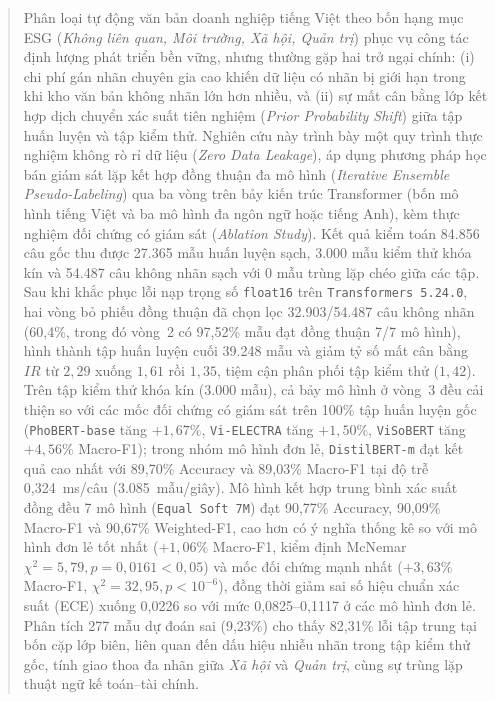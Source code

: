 \documentclass[journal,a4paper]{IEEEtran}
\newcommand{\code}[1]{\texttt{\small #1}}
\begin{document}
\begin{abstract}
Phân loại tự động văn bản doanh nghiệp tiếng Việt theo bốn hạng mục ESG (\textit{Không liên quan, Môi trường, Xã hội, Quản trị}) phục vụ công tác định lượng phát triển bền vững, nhưng thường gặp hai trở ngại chính: (i) chi phí gán nhãn chuyên gia cao khiến dữ liệu có nhãn bị giới hạn trong khi kho văn bản không nhãn lớn hơn nhiều, và (ii) sự mất cân bằng lớp kết hợp dịch chuyển xác suất tiên nghiệm (\textit{Prior Probability Shift}) giữa tập huấn luyện và tập kiểm thử. Nghiên cứu này trình bày một quy trình thực nghiệm không rò rỉ dữ liệu (\textit{Zero Data Leakage}), áp dụng phương pháp học bán giám sát lặp kết hợp đồng thuận đa mô hình (\textit{Iterative Ensemble Pseudo-Labeling}) qua ba vòng trên bảy kiến trúc Transformer (bốn mô hình tiếng Việt và ba mô hình đa ngôn ngữ hoặc tiếng Anh), kèm thực nghiệm đối chứng có giám sát (\textit{Ablation Study}). Kết quả kiểm toán 84.856 câu gốc thu được 27.365 mẫu huấn luyện sạch, 3.000 mẫu kiểm thử khóa kín và 54.487 câu không nhãn sạch với 0 mẫu trùng lặp chéo giữa các tập. Sau khi khắc phục lỗi nạp trọng số \code{float16} trên \code{Transformers 5.24.0}, hai vòng bỏ phiếu đồng thuận đã chọn lọc 32.903/54.487 câu không nhãn (60,4\%, trong đó vòng~2 có 97,52\% mẫu đạt đồng thuận 7/7 mô hình), hình thành tập huấn luyện cuối 39.248 mẫu và giảm tỷ số mất cân bằng $IR$ từ $2{,}29$ xuống $1{,}61$ rồi $1{,}35$, tiệm cận phân phối tập kiểm thử ($1{,}42$). Trên tập kiểm thử khóa kín (3.000 mẫu), cả bảy mô hình ở vòng~3 đều cải thiện so với các mốc đối chứng có giám sát trên 100\% tập huấn luyện gốc (\code{PhoBERT-base} tăng $+1{,}67\%$, \code{Vi-ELECTRA} tăng $+1{,}50\%$, \code{ViSoBERT} tăng $+4{,}56\%$ Macro-F1); trong nhóm mô hình đơn lẻ, \code{DistilBERT-m} đạt kết quả cao nhất với 89,70\% Accuracy và 89,03\% Macro-F1 tại độ trễ 0,324~ms/câu (3.085~mẫu/giây). Mô hình kết hợp trung bình xác suất đồng đều 7 mô hình (\code{Equal Soft 7M}) đạt 90,77\% Accuracy, 90,09\% Macro-F1 và 90,67\% Weighted-F1, cao hơn có ý nghĩa thống kê so với mô hình đơn lẻ tốt nhất ($+1{,}06\%$ Macro-F1, kiểm định McNemar $\chi^2 = 5{,}79, p = 0{,}0161 < 0{,}05$) và mốc đối chứng mạnh nhất ($+3{,}63\%$ Macro-F1, $\chi^2 = 32{,}95, p < 10^{-6}$), đồng thời giảm sai số hiệu chuẩn xác suất (ECE) xuống 0,0226 so với mức 0,0825--0,1117 ở các mô hình đơn lẻ. Phân tích 277 mẫu dự đoán sai (9,23\%) cho thấy 82,31\% lỗi tập trung tại bốn cặp lớp biên, liên quan đến dấu hiệu nhiễu nhãn trong tập kiểm thử gốc, tính giao thoa đa nhãn giữa \textit{Xã hội} và \textit{Quản trị}, cùng sự trùng lặp thuật ngữ kế toán--tài chính.
\end{abstract}
\end{document}
